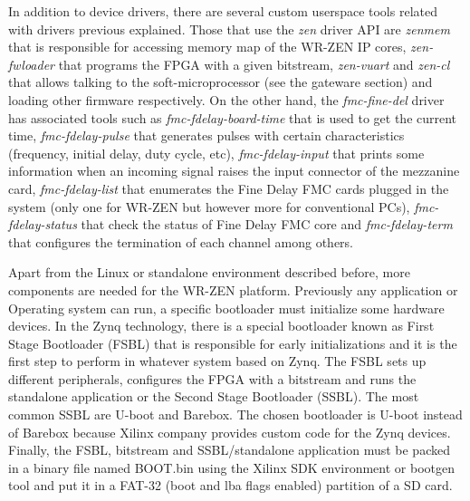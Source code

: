 In addition to device drivers, there are several custom userspace tools related with drivers previous explained. Those that use the \textit{zen} driver API are \textit{zenmem} that is responsible for accessing memory map of the WR-ZEN IP cores, \textit{zen-fwloader} that programs the FPGA with a given bitstream, \textit{zen-vuart} and \textit{zen-cl} that allows talking to the soft-microprocessor (see the gateware section) and loading other firmware respectively. On the other hand, the  \textit{fmc-fine-del} driver has associated tools such as \textit{fmc-fdelay-board-time} that is used to get the current time, \textit{fmc-fdelay-pulse} that generates pulses with certain characteristics (frequency, initial delay, duty cycle, etc), \textit{fmc-fdelay-input} that prints some information when an incoming signal raises the input connector of the mezzanine card, \textit{fmc-fdelay-list} that enumerates the Fine Delay FMC cards plugged in the system (only one for WR-ZEN but however more for conventional PCs), \textit{fmc-fdelay-status} that check the status of Fine Delay FMC core and \textit{fmc-fdelay-term} that configures the termination of each channel among others.

Apart from the Linux or standalone environment described before, more 
components are needed  for the WR-ZEN platform. Previously any application or 
Operating system can run, a specific bootloader must initialize some hardware 
devices. In the Zynq technology, there is a special bootloader known as First 
Stage Bootloader (FSBL) that is responsible for early initializations and it is 
the first step to perform in whatever system based on Zynq. The FSBL sets up 
different peripherals, configures the FPGA with a bitstream and runs the 
standalone application or the Second Stage Bootloader (SSBL). The most common 
SSBL are U-boot and Barebox. The chosen bootloader is U-boot instead of Barebox 
because Xilinx company provides custom code for the Zynq devices. Finally, the 
FSBL, bitstream and SSBL/standalone application must be packed in a 
binary file 
named BOOT.bin using the Xilinx SDK environment or bootgen tool and put it in a 
FAT-32 (boot and lba flags enabled) partition of a SD card.

